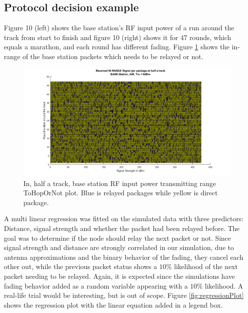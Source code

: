 \subsection{Protocol decision example}\label{sc:protocolDecisionExample}
Figure 10 (left) shows the base station's RF input power of a run around the track from start to finish and figure 10 (right) shows it for 47 rounds, which equals a marathon, and each round has different fading. Figure \ref{fig:recievedSignal_inRange_halfTrack} shows the in-range of the base station packets which needs to be relayed or not.


\begin{figure}[h]
	\centering
	\includegraphics[width=\linewidth]{theory/protocolDecisionExample/fig/recievedSignal_inRange_halfTrack.png}
	\caption{In, half a track, base station RF input power transmitting range ToHopOrNot plot. Blue is relayed packages while yellow is direct package.}
	\label{fig:recievedSignal_inRange_halfTrack}
\end{figure}

\noindent A multi linear regression was fitted on the simulated data with three predictors: Distance, signal strength and whether the packet had been relayed before. The goal was to determine if the node should relay the next packet or not. Since signal strength and distance are strongly correlated in our simulation, due to antenna approximations and the binary behavior of the fading, they cancel each other out, while the previous packet status shows a $10\%$ likelihood of the next packet needing to be relayed. Again, it is expected since the simulations have fading behavior added as a random variable appearing with a $10\%$ likelihood. A real-life trial would be interesting, but is out of scope. Figure \ref{fig:regressionPlot} shows the regression plot with the linear equation added in a legend box.

